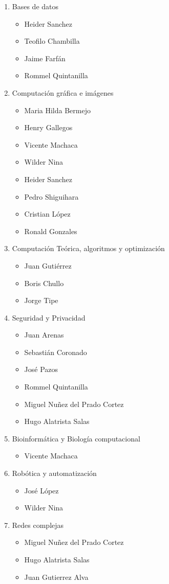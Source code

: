 \documentclass[12pt]{extarticle}
\begin{document}
\begin{enumerate}
\item Bases de datos 
\begin{itemize}		
\item Heider Sanchez
\item Teofilo Chambilla 
\item Jaime Farfán
\item Rommel Quintanilla
\end{itemize}

\item Computación gráfica e imágenes
\begin{itemize}
\item Maria Hilda Bermejo 
\item Henry Gallegos
\item Vicente Machaca
\item Wilder Nina
\item Heider Sanchez 
\item Pedro Shiguihara
\item Cristian López 
\item Ronald Gonzales
\end{itemize}

\item Computación Teórica, algoritmos y optimización 
\begin{itemize}
\item Juan Gutiérrez
\item Boris Chullo
\item Jorge Tipe
\end{itemize}

\item Seguridad y Privacidad
\begin{itemize}
\item Juan Arenas
\item Sebastián Coronado
\item José Pazos	
\item Rommel Quintanilla
\item Miguel Nuñez del Prado Cortez
\item Hugo Alatrista Salas
\end{itemize}

\item Bioinformática y Biología computacional
\begin{itemize}
\item Vicente Machaca
\end{itemize}

\item Robótica y automatización
\begin{itemize}
\item José López
\item Wilder Nina
\end{itemize}

\item Redes complejas
\begin{itemize}
\item Miguel Nuñez del Prado Cortez
\item Hugo Alatrista Salas
\item Juan Gutierrez Alva
\end{itemize}
\end{enumerate}
\end{document}
